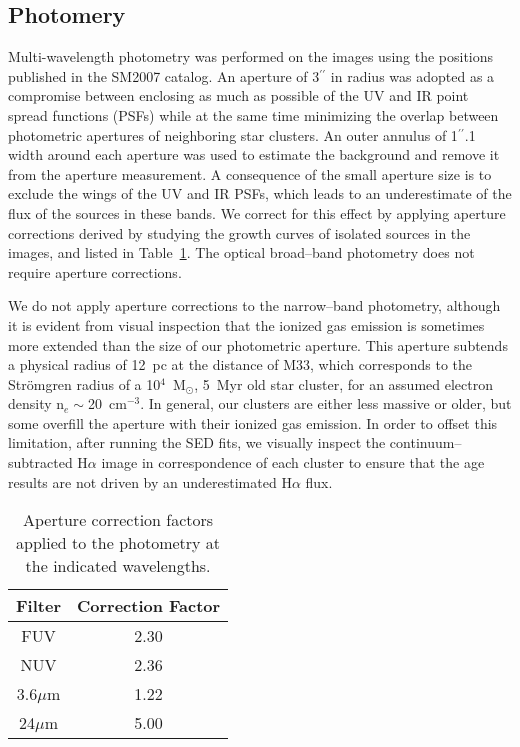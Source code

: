 \documentclass{aastex63}
\begin{document}
\subsection{Photomery}
Multi-wavelength photometry was performed on the images using the positions published in the SM2007 catalog. An aperture of 3$^{\prime\prime}$ in radius was adopted as a compromise between enclosing as much as possible of the UV and IR point spread functions (PSFs) while at the same time minimizing the overlap between photometric apertures of neighboring star clusters. An outer annulus of 1$^{\prime\prime}$.1 width around each aperture was used to estimate the background and remove it from the aperture measurement. A consequence of the small aperture size is to exclude the wings of the UV and IR PSFs, which leads to an  underestimate of the flux of the sources in these bands. We correct for this effect by applying aperture corrections derived by studying the growth curves of isolated sources in the images, and listed in Table~\ref{corr_table}. The optical broad--band photometry does not require aperture corrections.

We do not apply aperture corrections to the narrow--band photometry, although it is evident from visual inspection that the ionized gas emission is sometimes more extended than the size of our photometric aperture. This aperture subtends  a physical radius of 12~pc at the distance of M33, which corresponds to the Str\"omgren radius of a 10$^4$~M$_{\odot}$, 5~Myr old star cluster, for an assumed electron density n$_e\sim$20~cm$^{-3}$. In general, our clusters are either less massive or older, but some overfill the aperture with their ionized gas emission. In order to offset this limitation, after running the SED fits, we visually inspect the continuum--subtracted H$\alpha$ image in correspondence of each cluster to ensure that the age results are not driven by an underestimated H$\alpha$ flux.

\begin{table}[!htb]
\centering
\begin{tabular}{@{}cc@{}}
\toprule
Filter    & Correction Factor \\ \hline
FUV       & 2.30          \\
NUV       & 2.36          \\
3.6$\mu$m & 1.22          \\
24$\mu$m  & 5.00          \\ \hline
\end{tabular}
    \caption{Aperture correction factors applied to the photometry at the indicated wavelengths.}
    \label{corr_table}
\end{table}
\end{document}
